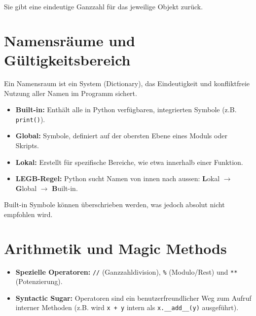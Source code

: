 Sie gibt eine eindeutige Ganzzahl für das jeweilige Objekt zurück.

\section{Namensräume und Gültigkeitsbereich}
Ein Namensraum ist ein System (Dictionary), das Eindeutigkeit und konfliktfreie Nutzung aller Namen im Programm sichert.

\begin{itemize}
    \item \textbf{Built-in:} Enthält alle in Python verfügbaren, integrierten Symbole (z.B. \texttt{print()}).
    \item \textbf{Global:} Symbole, definiert auf der obersten Ebene eines Moduls oder Skripts.
    \item \textbf{Lokal:} Erstellt für spezifische Bereiche, wie etwa innerhalb einer Funktion.
    \item \textbf{LEGB-Regel:} Python sucht Namen von innen nach aussen: \textbf{L}okal $\rightarrow$ \textbf{G}lobal $\rightarrow$ \textbf{B}uilt-in.
\end{itemize}

Built-in Symbole können überschrieben werden, was jedoch absolut nicht empfohlen wird.

\section{Arithmetik und Magic Methods}
\begin{itemize}
    \item \textbf{Spezielle Operatoren:} \texttt{//} (Ganzzahldivision), \texttt{\%} (Modulo/Rest) und \texttt{**} (Potenzierung).
    \item \textbf{Syntactic Sugar:} Operatoren sind ein benutzerfreundlicher Weg zum Aufruf interner Methoden (z.B. wird \texttt{x + y} intern als \texttt{x.\_\_add\_\_(y)} ausgeführt).
\end{itemize}

